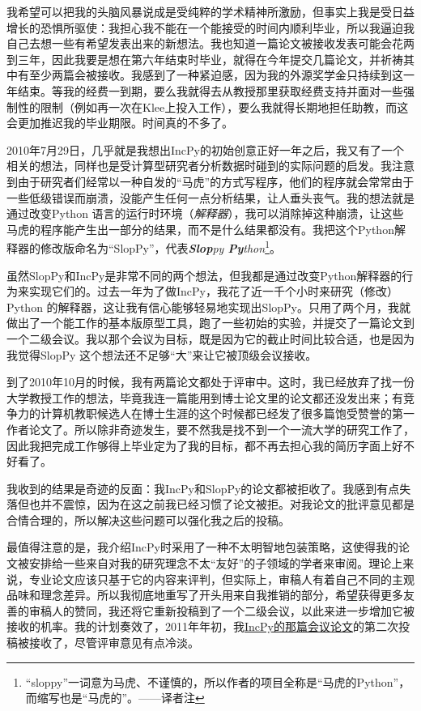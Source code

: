 \documentclass[letter,12pt]{book}
\begin{document}
\begin{CJK}{UTF8}{gbsn}
我希望可以把我的头脑风暴说成是受纯粹的学术精神所激励，但事实上我是受日益增长的恐惧所驱使：我担心我不能在一个能接受的时间内顺利毕业，所以我逼迫我自己去想一些有希望发表出来的新想法。我也知道一篇论文被接收发表可能会花两到三年，因此我要是想在第六年结束时毕业，就得在今年提交几篇论文，并祈祷其中有至少两篇会被接收。我感到了一种紧迫感，因为我的外源奖学金只持续到这一年结束。等我的经费一到期，要么我就得去从教授那里获取经费支持并面对一些强制性的限制（例如再一次在Klee上投入工作），要么我就得长期地担任助教，而这会更加推迟我的毕业期限。时间真的不多了。

2010年7月29日，几乎就是我想出IncPy的初始创意正好一年之后，我又有了一个相关的想法，同样也是受计算型研究者分析数据时碰到的实际问题的启发。我注意到由于研究者们经常以一种自发的“马虎”的方式写程序，他们的程序就会常常由于一些低级错误而崩溃，没能产生任何一点分析结果，让人垂头丧气。我的想法就是通过改变Python 语言的运行时环境（\emph{解释器}），我可以消除掉这种崩溃，让这些马虎的程序能产生出一部分的结果，而不是什么结果都没有。我把这个Python解释器的修改版命名为“SlopPy”，代表\emph{\textbf{Slop}py \textbf{Py}thon}\footnote{``sloppy''一词意为马虎、不谨慎的，所以作者的项目全称是“马虎的Python”，而缩写也是“马虎的”。——译者注}。

虽然SlopPy和IncPy是非常不同的两个想法，但我都是通过改变Python解释器的行为来实现它们的。过去一年为了做IncPy，我花了近一千个小时来研究（修改）Python 的解释器，这让我有信心能够轻易地实现出SlopPy。只用了两个月，我就做出了一个能工作的基本版原型工具，跑了一些初始的实验，并提交了一篇论文到一个二级会议。我以那个会议为目标，既是因为它的截止时间比较合适，也是因为我觉得SlopPy 这个想法还不足够“大”来让它被顶级会议接收。

\breakline

到了2010年10月的时候，我有两篇论文都处于评审中。这时，我已经放弃了找一份大学教授工作的想法，毕竟我连一篇能用到博士论文里的论文都还没发出来；有竞争力的计算机教职候选人在博士生涯的这个时候都已经发了很多篇饱受赞誉的第一作者论文了。所以除非奇迹发生，要不然我是找不到一个一流大学的研究工作了，因此我把完成工作够得上毕业定为了我的目标，都不再去担心我的简历字面上好不好看了。

我收到的结果是奇迹的反面：我IncPy和SlopPy的论文都被拒收了。我感到有点失落但也并不震惊，因为在这之前我已经习惯了论文被拒。对我论文的批评意见都是合情合理的，所以解决这些问题可以强化我之后的投稿。

最值得注意的是，我介绍IncPy时采用了一种不太明智地包装策略，这使得我的论文被安排给一些来自对我的研究理念不太“友好”的子领域的学者来审阅。理论上来说，专业论文应该只基于它的内容来评判，但实际上，审稿人有着自己不同的主观品味和理念差异。所以我彻底地重写了开头用来自我推销的部分，希望获得更多友善的审稿人的赞同，我还将它重新投稿到了一个二级会议，以此来进一步增加它被接收的机率。我的计划奏效了，2011年年初，我\href{http://www.pgbovine.net/projects/pubs/guo_issta11_camera_ready.pdf}{IncPy的那篇会议论文}的第二次投稿被接收了，尽管评审意见有点冷淡。


\end{CJK}
\end{document}
